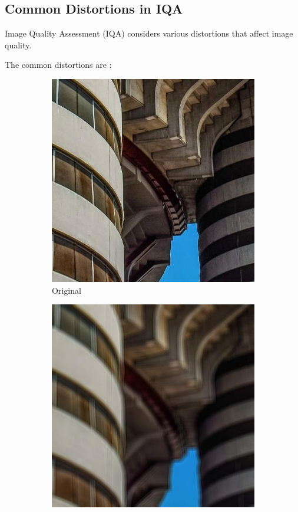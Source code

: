 \subsection{Common Distortions in IQA}
\label{sub:CommonDistortionsIQA}
Image Quality Assessment (IQA) considers various distortions that affect image quality. \par
The common distortions are \cite{https://arxiv.org/abs/2310.14918}:
\begin{figure}[ht]
    \centering
    \begin{subfigure}[b]{0.24\textwidth}
        \includegraphics[width=\textwidth]{img/Original.jpg}
        \caption{Original}
    \end{subfigure}
    \hfill
    \begin{subfigure}[b]{0.24\textwidth}
        \includegraphics[width=\textwidth]{img/Blur.jpg}

\end{subfigure}
\end{figure}
